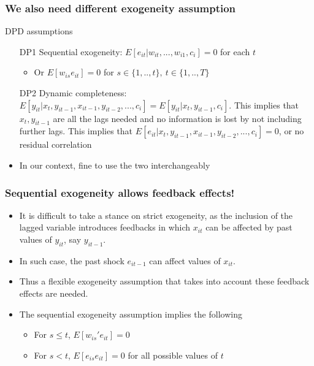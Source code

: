 \documentclass[aspectratio=169]{beamer}
\begin{document}
\begin{frame}
\frametitle{We also need different exogeneity assumption}
\begin{block}{DPD assumptions}
\begin{itemize}
\item[DP1] Sequential exogeneity: $E[e_{it}|w_{it},...,w_{i1},c_i]=0$ for each $t$
\begin{itemize}
\item Or $E[w_{is}e_{it}]=0$ for $s\in\{1,..,t\}, \ t\in\{1,..,T\}$
\end{itemize}
\item[DP2] Dynamic completeness: $E[y_{it}|x_t, y_{it-1}, x_{it-1}, y_{it-2},...,c_i]=E[y_{it}|x_t, y_{it-1},c_i]$. This implies that $x_t, y_{it-1}$ are all the lags needed and no information is lost by not including further lags. This implies that $E[e_{it}|x_t, y_{it-1}, x_{it-1}, y_{it-2},...,c_i]=0$, or no residual correlation
\end{itemize}
\end{block}
\begin{itemize}
\item In our context, fine to use the two interchangeably
 \end{itemize}
\end{frame}

\begin{frame}
\frametitle{Sequential exogeneity allows feedback effects!}
\begin{itemize}
\item It is difficult to take a stance on strict exogeneity, as the inclusion of the lagged variable introduces feedbacks in which $x_{it}$ can be affected by past values of $y_{it}$, say $y_{it-1}$. 
\item In such case, the past shock $e_{it-1}$ can affect values of $x_{it}$. 
\item Thus a flexible exogeneity assumption that takes into account these feedback effects are needed.
\par
\item The sequential exogeneity assumption implies the following
\begin{itemize}
\item For $s\leq t$, $E[w_{is}'e_{it}]=0$
\item For $s< t$, $E[e_{is}e_{it}]=0$ for all possible values of $t$
\end{itemize}
 \end{itemize}
\end{frame}
\end{document}

